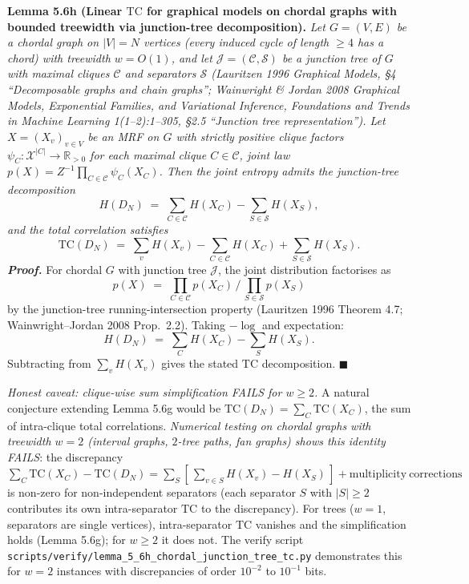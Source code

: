 \documentclass[
]{article}
\begin{document}
\textbf{Lemma 5.6h (Linear $\mathrm{TC}$ for graphical models on
chordal graphs with bounded treewidth via junction-tree decomposition).}
\emph{Let $G = (V, E)$ be a chordal graph on $|V| = N$ vertices
(every induced cycle of length $\geq 4$ has a chord) with treewidth
$w = O(1)$, and let $\mathcal{J} = (\mathcal{C}, \mathcal{S})$ be a
junction tree of $G$ with maximal cliques $\mathcal{C}$ and separators
$\mathcal{S}$ (Lauritzen 1996 \emph{Graphical Models}, §4
``Decomposable graphs and chain graphs''; Wainwright \& Jordan 2008
\emph{Graphical Models, Exponential Families, and Variational
Inference}, Foundations and Trends in Machine Learning 1(1--2):1--305,
§2.5 ``Junction tree representation''). Let
$X = (X_v)_{v \in V}$ be an MRF on $G$ with strictly positive
clique factors $\psi_C : \mathcal{X}^{|C|} \to \mathbb{R}_{>0}$ for
each maximal clique $C \in \mathcal{C}$, joint law
$p(X) = Z^{-1} \prod_{C \in \mathcal{C}} \psi_C(X_C)$. Then the joint
entropy admits the junction-tree decomposition}
\[
H(D_N) \;=\; \sum_{C \in \mathcal{C}} H(X_C) - \sum_{S \in \mathcal{S}} H(X_S),
\]
\emph{and the total correlation satisfies}
\[
\mathrm{TC}(D_N) \;=\; \sum_v H(X_v) - \sum_{C \in \mathcal{C}} H(X_C)
                       + \sum_{S \in \mathcal{S}} H(X_S).
\]
\emph{\textbf{Proof.}} For chordal $G$ with junction tree $\mathcal{J}$,
the joint distribution factorises as
\[
p(X) \;=\; \prod_{C \in \mathcal{C}} p(X_C) \,\Big/\, \prod_{S \in \mathcal{S}} p(X_S)
\]
by the junction-tree running-intersection property
(Lauritzen 1996 Theorem 4.7; Wainwright--Jordan 2008 Prop.\ 2.2).
Taking $-\log$ and expectation:
\[
H(D_N) \;=\; \sum_{C} H(X_C) - \sum_{S} H(X_S).
\]
Subtracting from $\sum_v H(X_v)$ gives the stated $\mathrm{TC}$
decomposition.
\hfill$\blacksquare$

\emph{Honest caveat: clique-wise sum simplification FAILS for $w \geq 2$.}
A natural conjecture extending Lemma 5.6g would be
$\mathrm{TC}(D_N) = \sum_C \mathrm{TC}(X_C)$, the sum of intra-clique
total correlations. \emph{Numerical testing on chordal graphs with
treewidth $w = 2$ (interval graphs, $2$-tree paths, fan graphs)
shows this identity FAILS}: the discrepancy
$\sum_C \mathrm{TC}(X_C) - \mathrm{TC}(D_N) = \sum_S [\,\sum_{v \in S}
H(X_v) - H(X_S)\,] + \mathrm{multiplicity\ corrections}$ is non-zero
for non-independent separators (each separator $S$ with $|S| \geq 2$
contributes its own intra-separator $\mathrm{TC}$ to the
discrepancy). For trees ($w = 1$, separators are single vertices),
intra-separator $\mathrm{TC}$ vanishes and the simplification holds
(Lemma 5.6g); for $w \geq 2$ it does not. The verify script
\texttt{scripts/verify/lemma\_5\_6h\_chordal\_junction\_tree\_tc.py}
demonstrates this for $w = 2$ instances with discrepancies of order
$10^{-2}$ to $10^{-1}$ bits.
\end{document}

